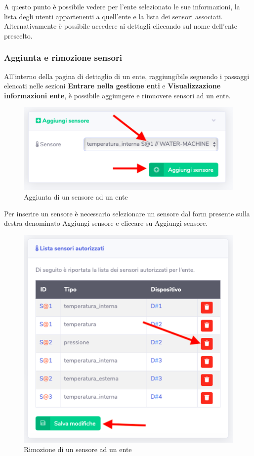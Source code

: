 		A questo punto è possibile vedere per l'ente selezionato le sue informazioni, la lista degli utenti appartenenti a quell'ente e la lista dei sensori associati.
		Alternativamente è possibile accedere ai dettagli cliccando sul nome dell'ente prescelto.

	\subsubsection{Aggiunta e rimozione sensori}
		All'interno della pagina di dettaglio di un ente, raggiungibile seguendo i passaggi elencati nelle sezioni \textbf{Entrare nella gestione enti} e \textbf{Visualizzazione informazioni ente}, è possibile aggiungere e rimuovere sensori ad un ente.

		\begin{figure}[H]
		\centering
		\includegraphics[scale=0.600]{res/images/admin/aggSensoreEnte.png}
		\caption{Aggiunta di un sensore ad un ente}
	\end{figure}

		Per inserire un sensore è necessario selezionare un sensore dal form presente sulla destra denominato Aggiungi sensore e cliccare su Aggiungi sensore.

		\begin{figure}[H]
		\centering
		\includegraphics[scale=0.600]{res/images/admin/rimSensoreEnte.png}
		\caption{Rimozione di un sensore ad un ente}
	\end{figure}

